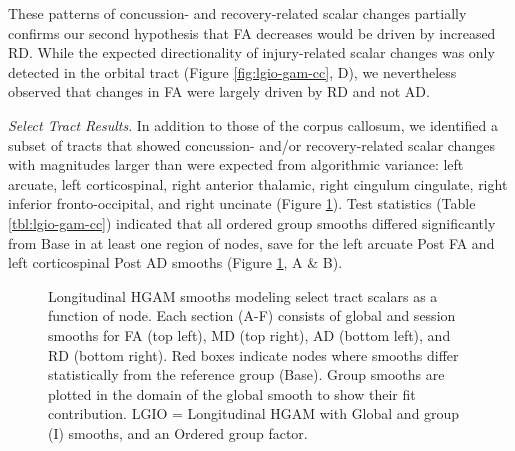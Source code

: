 \documentclass[12pt]{article}
\begin{document}
These patterns of concussion- and recovery-related scalar changes partially confirms our second hypothesis that FA decreases would be driven by increased RD. While the expected directionality of injury-related scalar changes was only detected in the orbital tract (Figure \ref{fig:lgio-gam-cc}, D), we nevertheless observed that changes in FA were largely driven by RD and not AD.


\textit{Select Tract Results}. In addition to those of the corpus callosum, we identified a subset of tracts that showed concussion- and/or recovery-related scalar changes with magnitudes larger than were expected from algorithmic variance: left arcuate, left corticospinal, right anterior thalamic, right cingulum cingulate, right inferior fronto-occipital, and right uncinate (Figure \ref{fig:lgio-gam-sel}). Test statistics (Table \ref{tbl:lgio-gam-cc}) indicated that all ordered group smooths differed significantly from Base in at least one region of nodes, save for the left arcuate Post FA and left corticospinal Post AD smooths (Figure \ref{fig:lgio-gam-sel}, A \& B).

\begin{figure}[H]
	\centering
	\caption{Longitudinal HGAM smooths modeling select tract scalars as a function of node. Each section (A-F) consists of global and session smooths for FA (top left), MD (top right), AD (bottom left), and RD (bottom right). Red boxes indicate nodes where smooths differ statistically from the reference group (Base). Group smooths are plotted in the domain of the global smooth to show their fit contribution. LGIO = Longitudinal HGAM with Global and group (I) smooths, and an Ordered group factor.}
	\label{fig:lgio-gam-sel}
\end{figure}
\end{document}
